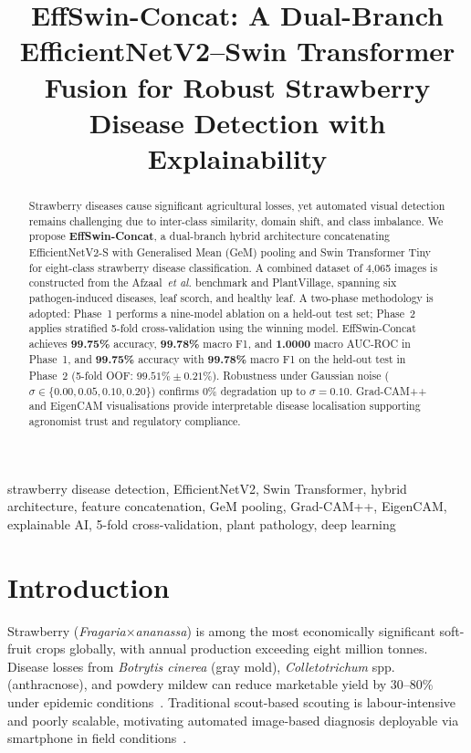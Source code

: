 \documentclass[conference]{IEEEtran}
\begin{document}
\title{EffSwin-Concat: A Dual-Branch EfficientNetV2--Swin Transformer Fusion for Robust Strawberry Disease Detection with Explainability}


\maketitle

\begin{abstract}
Strawberry diseases cause significant agricultural losses, yet automated visual detection remains challenging due to inter-class similarity, domain shift, and class imbalance. We propose \textbf{EffSwin-Concat}, a dual-branch hybrid architecture concatenating EfficientNetV2-S with Generalised Mean (GeM) pooling and Swin Transformer Tiny for eight-class strawberry disease classification. A combined dataset of 4,065 images is constructed from the Afzaal~\textit{et al.} benchmark and PlantVillage, spanning six pathogen-induced diseases, leaf scorch, and healthy leaf. A two-phase methodology is adopted: Phase~1 performs a nine-model ablation on a held-out test set; Phase~2 applies stratified 5-fold cross-validation using the winning model. EffSwin-Concat achieves \textbf{99.75\%} accuracy, \textbf{99.78\%} macro F1, and \textbf{1.0000} macro AUC-ROC in Phase~1, and \textbf{99.75\%} accuracy with \textbf{99.78\%} macro F1 on the held-out test in Phase~2 (5-fold OOF: $99.51\%\pm0.21\%$). Robustness under Gaussian noise ($\sigma\in\{0.00,0.05,0.10,0.20\}$) confirms 0\% degradation up to $\sigma{=}0.10$. Grad-CAM++ and EigenCAM visualisations provide interpretable disease localisation supporting agronomist trust and regulatory compliance.
\end{abstract}

\begin{IEEEkeywords}
strawberry disease detection, EfficientNetV2, Swin Transformer, hybrid architecture, feature concatenation, GeM pooling, Grad-CAM++, EigenCAM, explainable AI, 5-fold cross-validation, plant pathology, deep learning
\end{IEEEkeywords}

\section{Introduction}

Strawberry (\textit{Fragaria}$\times$\textit{ananassa}) is among the most economically significant soft-fruit crops globally, with annual production exceeding eight million tonnes. Disease losses from \textit{Botrytis cinerea} (gray mold), \textit{Colletotrichum} spp. (anthracnose), and powdery mildew can reduce marketable yield by 30--80\% under epidemic conditions~\cite{b1}. Traditional scout-based scouting is labour-intensive and poorly scalable, motivating automated image-based diagnosis deployable via smartphone in field conditions~\cite{b2}.
\end{document}
